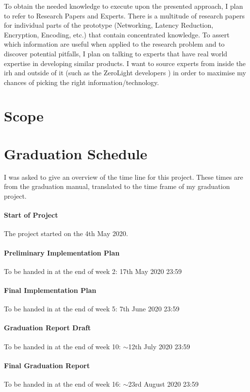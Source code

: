 \documentclass[]{article}
\begin{document}
To obtain the needed knowledge to execute upon the presented approach, I plan to refer to Research Papers and Experts. There is a multitude of research papers for individual parts of the prototype (Networking, Latency Reduction, Encryption, Encoding, etc.) that contain concentrated knowledge. To assert which information are useful when applied to the research problem and to discover potential pitfalls, I plan on talking to experts that have real world expertise in developing similar products. I want to source experts from inside the \acrfull{irh} and outside of it (such as the ZeroLight developers \parencite{zerolight5g}) in order to maximise my chances of picking the right information/technology. 

\newpage
\section{Scope}

\newpage
\section{Graduation Schedule}
I was asked to give an overview of the time line for this project. These times are from the graduation manual, translated to the time frame of my graduation project. 
\paragraph{Start of Project}
The project started on the 4th May 2020.
\paragraph{Preliminary Implementation Plan}
To be handed in at the end of week 2: 17th May 2020 23:59
\paragraph{Final Implementation Plan}
To be handed in at the end of week 5: 7th June 2020 23:59
\paragraph{Graduation Report Draft}
To be handed in at the end of week 10: $\sim$12th July 2020 23:59
\paragraph{Final Graduation Report}
To be handed in at the end of week 16: $\sim$23rd August 2020 23:59

\newpage
\printbibliography
\end{document}
